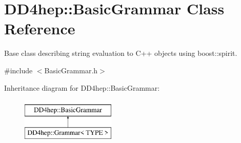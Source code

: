 \hypertarget{class_d_d4hep_1_1_basic_grammar}{}\section{D\+D4hep\+:\+:Basic\+Grammar Class Reference}
\label{class_d_d4hep_1_1_basic_grammar}


Base class describing string evaluation to C++ objects using boost\+::spirit.  




{\ttfamily \#include $<$Basic\+Grammar.\+h$>$}

Inheritance diagram for D\+D4hep\+:\+:Basic\+Grammar\+:\begin{figure}[H]
\begin{center}
\leavevmode
\includegraphics[height=2.000000cm]{class_d_d4hep_1_1_basic_grammar}
\end{center}
\end{figure}
